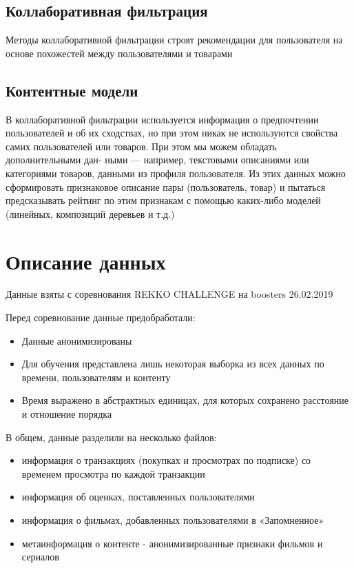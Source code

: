 \documentclass[11pt]{article}
\begin{document}
\subsection{Коллаборативная фильтрация}
\label{sec:orgf3563c6}
Методы коллаборативной фильтрации строят рекомендации для пользователя
на основе похожестей между пользователями и товарами
\subsection{Контентные модели}
\label{sec:orgd7ba4d2}
В коллаборативной фильтрации используется информация о предпочтении
пользователей и об их сходствах, но при этом никак не используются свойства самих пользователей или товаров. При этом мы можем обладать дополнительными дан-
ными — например, текстовыми описаниями или категориями товаров, данными из
профиля пользователя. Из этих данных можно сформировать признаковое описание
пары (пользователь, товар) и пытаться предсказывать рейтинг по этим признакам с
помощью каких-либо моделей (линейных, композиций деревьев и т.д.)
\section{Описание данных}
\label{sec:org908fbd6}
Данные взяты с соревнования REKKO CHALLENGE на boosters 26.02.2019 

Перед соревнование данные предобработали:
\begin{itemize}
\item Данные анонимизированы
\item Для обучения представлена лишь некоторая выборка из всех данных по времени, пользователям и контенту
\item Время выражено в абстрактных единицах, для которых сохранено расстояние и отношение порядка
\end{itemize}

В общем, данные разделили на несколько файлов:
\begin{itemize}
\item информация о транзакциях (покупках и просмотрах по подписке) со временем просмотра по каждой транзакции
\item информация об оценках, поставленных пользователями
\item информация о фильмах, добавленных пользователями в «Запомненное»
\item метаинформация о контенте - анонимизированные признаки фильмов и сериалов
\end{itemize}
\end{document}

